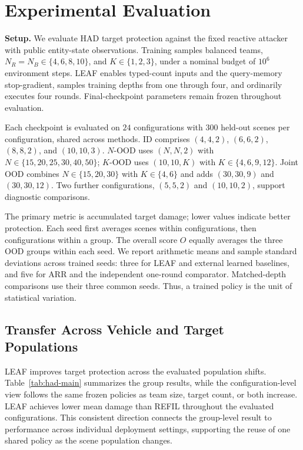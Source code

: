 \section{Experimental Evaluation}
\label{sec:results}
\noindent\textbf{Setup.}
We evaluate HAD target protection against the fixed reactive attacker with public entity-state observations. Training samples balanced teams, $N_R=N_B\in\{4,6,8,10\}$, and $K\in\{1,2,3\}$, under a nominal budget of $10^6$ environment steps. LEAF enables typed-count inputs and the query-memory stop-gradient, samples training depths from one through four, and ordinarily executes four rounds. Final-checkpoint parameters remain frozen throughout evaluation.

Each checkpoint is evaluated on $24$ configurations with $300$ held-out scenes per configuration, shared across methods. ID comprises $(4,4,2)$, $(6,6,2)$, $(8,8,2)$, and $(10,10,3)$. $N$-OOD uses $(N,N,2)$ with $N\in\{15,20,25,30,40,50\}$; $K$-OOD uses $(10,10,K)$ with $K\in\{4,6,9,12\}$. Joint OOD combines $N\in\{15,20,30\}$ with $K\in\{4,6\}$ and adds $(30,30,9)$ and $(30,30,12)$. Two further configurations, $(5,5,2)$ and $(10,10,2)$, support diagnostic comparisons.

The primary metric is accumulated target damage; lower values indicate better protection. Each seed first averages scenes within configurations, then configurations within a group. The overall score $O$ equally averages the three OOD groups within each seed. We report arithmetic means and sample standard deviations across trained seeds: three for LEAF and external learned baselines, and five for ARR and the independent one-round comparator. Matched-depth comparisons use their three common seeds. Thus, a trained policy is the unit of statistical variation.

\subsection{Transfer Across Vehicle and Target Populations}
LEAF improves target protection across the evaluated population shifts. Table~\ref{tab:had-main} summarizes the group results, while the configuration-level view follows the same frozen policies as team size, target count, or both increase. LEAF achieves lower mean damage than REFIL throughout the evaluated configurations. This consistent direction connects the group-level result to performance across individual deployment settings, supporting the reuse of one shared policy as the scene population changes.

